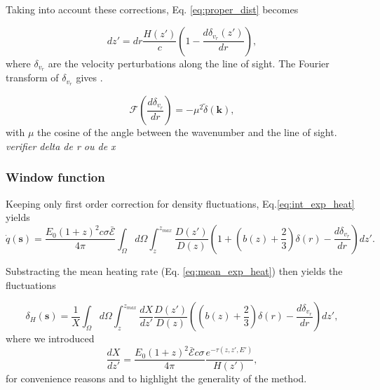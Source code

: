 \documentclass[onecolumn]{emulateapj}
\begin{document}


Taking into account these corrections,  Eq. \ref{eq:proper_dist} becomes

  \begin{equation}
    \label{eq:vel_perturb}
    dz'=dr\frac{H(z')}{c}\left(1-\frac{d\delta_{v_r}(z')}{dr}\right),
  \end{equation}
where $\delta_{v_r}$ are the velocity perturbations along the line of sight.
The Fourier transform of $\delta_{v_r}$ gives  \citep{1987MNRAS.227....1K}.

\begin{equation}
  \label{eq:kaiser2}
  \mathcal{F}\left(\frac{d\delta_{v_r}}{dr}\right)=-\mu^2\tilde{\delta}(\mathbf{k}),
\end{equation}
with $\mu$ the cosine of the angle between the wavenumber and the line of sight.
\textit{verifier delta de r ou de x}

\subsubsection{Window function }
Keeping only first order correction for density fluctuations, Eq.\ref{eq:int_exp_heat} yields
\begin{equation}
  \label{eq:mean_heat0}
  \dot{q}(\mathbf{s})=\frac{E_0(1+z)^2c\sigma\mathcal{\bar{E}}}{4\pi}\int_{\Omega}d\Omega\int_z^{z_{max}}\frac{D(z')}{D(z)}\left(1+\left(b(z)+\frac{2}{3}\right) \delta(r) -\frac{d\delta_{v_r}}{dr}\right) dz'.
\end{equation}

Substracting the mean heating rate (Eq. \ref{eq:mean_exp_heat}) then yields the fluctuations

\begin{equation}
  \label{eq:heat_fluc0}
  \delta_H(\mathbf{s})=\frac{1}{X}\int_{\Omega}d\Omega\int_z^{z_{max}}\frac{dX}{dz'}\frac{D(z')}{D(z)}\left(\left(b(z)+\frac{2}{3}\right) \delta(r) -\frac{d\delta_{v_r}}{dr}\right)   dz',
\end{equation}
where we introduced
\begin{equation}
  \label{eq:def_X}
  \frac{dX}{dz'}=\frac{E_0(1+z)^2\mathcal{\bar{E}}c\sigma}{4\pi}\frac{e^{-\tau(z,z',E')}}{H(z')},
\end{equation}
for convenience reasons and to highlight the generality of the method.
\end{document}
